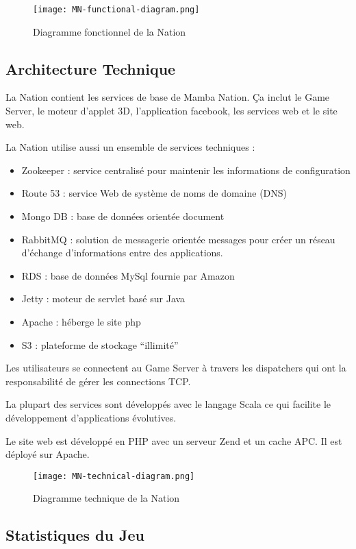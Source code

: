 \begin{center}
\begin{figure}[H]
  \texttt{[image: MN-functional-diagram.png]} 
  \caption{Diagramme fonctionnel de la Nation}
\end{figure}
\end{center}

\subsection{Architecture Technique}

La Nation contient les services de base de Mamba Nation. Ça inclut le Game
Server, le moteur d'applet 3D, l'application facebook, les services web et le
site web.

La Nation utilise aussi un ensemble de services techniques :
\begin{itemize}
\item Zookeeper : service centralisé pour maintenir les informations de configuration
\item Route 53 : service Web de système de noms de domaine (DNS)
\item Mongo DB : base de données orientée document
\item RabbitMQ : solution de messagerie orientée messages pour créer un réseau
  d'échange d'informations entre des applications.
\item RDS : base de données MySql fournie par Amazon
\item Jetty : moteur de servlet basé sur Java
\item Apache : héberge le site php
\item S3 : plateforme de stockage ``illimité''
\end{itemize}

Les utilisateurs se connectent au Game Server à travers les dispatchers qui ont la
responsabilité de gérer les connections TCP.

La plupart des services sont développés avec le langage Scala ce qui facilite le
développement d'applications évolutives.

Le site web est développé en PHP avec un serveur Zend et un cache APC. Il est
déployé sur Apache.

\begin{figure}[H]
  \texttt{[image: MN-technical-diagram.png]} 
  \caption{Diagramme technique de la Nation}
\end{figure}

\subsection{Statistiques du Jeu}

